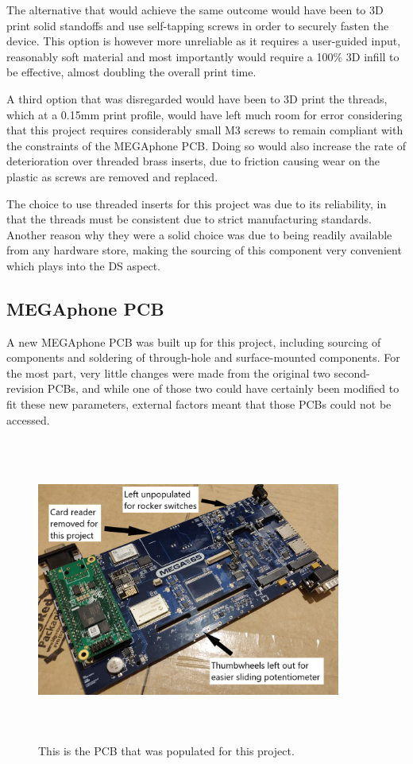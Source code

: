 The alternative that would achieve the same outcome would have been to 3D print solid standoffs and use self-tapping screws in order to securely fasten the device.
This option is however more unreliable as it requires a user-guided input, reasonably soft material and most importantly would require a 100\% 3D infill to be effective, almost doubling the overall print time.

A third option that was disregarded would have been to 3D print the threads, which at a 0.15mm print profile, would have left much room for error considering that this project requires considerably small M3 screws to remain compliant with the constraints of the MEGAphone PCB.
Doing so would also increase the rate of deterioration over threaded brass inserts, due to friction causing wear on the plastic as screws are removed and replaced.

The choice to use threaded inserts for this project was due to its reliability, in that the threads must be consistent due to strict manufacturing standards.
Another reason why they were a solid choice was due to being readily available from any hardware store, making the sourcing of this component very convenient which plays into the DS aspect.

\subsection{MEGAphone PCB}
A new MEGAphone PCB was built up for this project, including sourcing of components and soldering of through-hole and surface-mounted components.
For the most part, very little changes were made from the original two second-revision PCBs, and while one of those two could have certainly been modified to fit these new parameters, external factors meant that those PCBs could not be accessed.

\begin{figure} [h]
    \centering
    \includegraphics[width=10cm,height=10cm,keepaspectratio]{Figures/megaphone_pcb.png}
    \caption{This is the PCB that was populated for this project.}
    \label{fig:PCB}
\end{figure}

